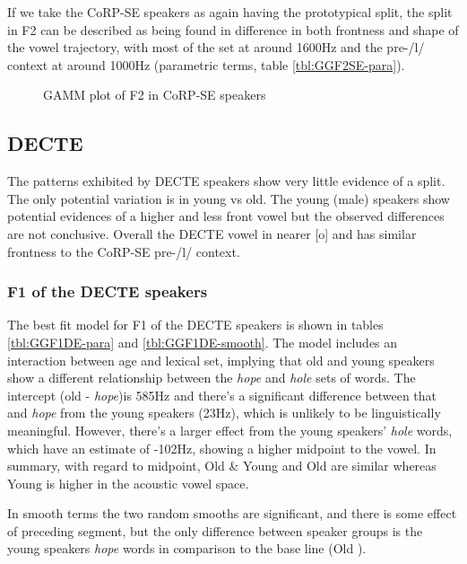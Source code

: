 \documentclass[../../../00.FullDoc/tex/Thesis]{subfiles}
\begin{document}
If we take the CoRP-SE speakers as again having the prototypical split, the \GG{} split in F2 can be described as being found in difference in both frontness and shape of the vowel trajectory, with most of the set at around 1600Hz and the pre-/l/ context at around 1000Hz (parametric terms, table \ref{tbl:GGF2SE-para}).

\begin{figure}[h]
	
	\caption{GAMM plot of F2 in CoRP-SE speakers} \label{fig:GGF2SE}
\end{figure}


\subsection{DECTE}
The patterns exhibited by DECTE speakers show very little evidence of a \GG{} split. The only potential variation is in young vs old. The young (male) speakers show potential evidences of a higher and less front \hole{} vowel but the observed differences are not conclusive. Overall the DECTE vowel in nearer [o] and has similar frontness to the CoRP-SE pre-/l/ context.

\subsubsection{F1 of the DECTE speakers}
The best fit model for F1 of the DECTE speakers is shown in tables \ref{tbl:GGF1DE-para} and \ref{tbl:GGF1DE-smooth}. The model includes an interaction between age and lexical set, implying that old and young speakers show a different relationship between the \textit{hope} and \textit{hole} sets of words. The intercept (old - \textit{hope})is 585Hz and there's a significant difference between that and \textit{hope} from the young speakers (23Hz), which is unlikely to be linguistically meaningful. However, there's a larger effect from the young speakers' \textit{hole} words, which have an estimate of -102Hz, showing a higher midpoint to the vowel. In summary, with regard to midpoint, Old \& Young \hope{} and Old \hole{} are similar whereas Young \hole{} is higher in the acoustic vowel space.

In smooth terms the two random smooths are significant, and there is some effect of preceding segment, but the only difference between speaker groups is the young speakers \textit{hope} words in comparison to the base line (Old \hope{}). 
\end{document}
